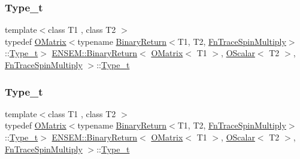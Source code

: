 \subsubsection{\texorpdfstring{Type\_t}{Type\_t}\hspace{0.1cm}{\footnotesize\ttfamily [2/3]}}
{\footnotesize\ttfamily template$<$class T1 , class T2 $>$ \\
typedef \mbox{\hyperlink{classENSEM_1_1OMatrix}{O\+Matrix}}$<$typename \mbox{\hyperlink{structENSEM_1_1BinaryReturn}{Binary\+Return}}$<$T1, T2, \mbox{\hyperlink{structENSEM_1_1FnTraceSpinMultiply}{Fn\+Trace\+Spin\+Multiply}}$>$\+::\mbox{\hyperlink{structENSEM_1_1BinaryReturn_3_01OMatrix_3_01T1_01_4_00_01OScalar_3_01T2_01_4_00_01FnTraceSpinMultiply_01_4_a7365e18c420935c8845b95d78d843106}{Type\+\_\+t}}$>$ \mbox{\hyperlink{structENSEM_1_1BinaryReturn}{E\+N\+S\+E\+M\+::\+Binary\+Return}}$<$ \mbox{\hyperlink{classENSEM_1_1OMatrix}{O\+Matrix}}$<$ T1 $>$, \mbox{\hyperlink{classENSEM_1_1OScalar}{O\+Scalar}}$<$ T2 $>$, \mbox{\hyperlink{structENSEM_1_1FnTraceSpinMultiply}{Fn\+Trace\+Spin\+Multiply}} $>$\+::\mbox{\hyperlink{structENSEM_1_1BinaryReturn_3_01OMatrix_3_01T1_01_4_00_01OScalar_3_01T2_01_4_00_01FnTraceSpinMultiply_01_4_a7365e18c420935c8845b95d78d843106}{Type\+\_\+t}}}

\mbox{\label{structENSEM_1_1BinaryReturn_3_01OMatrix_3_01T1_01_4_00_01OScalar_3_01T2_01_4_00_01FnTraceSpinMultiply_01_4_a7365e18c420935c8845b95d78d843106}} 
\subsubsection{\texorpdfstring{Type\_t}{Type\_t}\hspace{0.1cm}{\footnotesize\ttfamily [3/3]}}
{\footnotesize\ttfamily template$<$class T1 , class T2 $>$ \\
typedef \mbox{\hyperlink{classENSEM_1_1OMatrix}{O\+Matrix}}$<$typename \mbox{\hyperlink{structENSEM_1_1BinaryReturn}{Binary\+Return}}$<$T1, T2, \mbox{\hyperlink{structENSEM_1_1FnTraceSpinMultiply}{Fn\+Trace\+Spin\+Multiply}}$>$\+::\mbox{\hyperlink{structENSEM_1_1BinaryReturn_3_01OMatrix_3_01T1_01_4_00_01OScalar_3_01T2_01_4_00_01FnTraceSpinMultiply_01_4_a7365e18c420935c8845b95d78d843106}{Type\+\_\+t}}$>$ \mbox{\hyperlink{structENSEM_1_1BinaryReturn}{E\+N\+S\+E\+M\+::\+Binary\+Return}}$<$ \mbox{\hyperlink{classENSEM_1_1OMatrix}{O\+Matrix}}$<$ T1 $>$, \mbox{\hyperlink{classENSEM_1_1OScalar}{O\+Scalar}}$<$ T2 $>$, \mbox{\hyperlink{structENSEM_1_1FnTraceSpinMultiply}{Fn\+Trace\+Spin\+Multiply}} $>$\+::\mbox{\hyperlink{structENSEM_1_1BinaryReturn_3_01OMatrix_3_01T1_01_4_00_01OScalar_3_01T2_01_4_00_01FnTraceSpinMultiply_01_4_a7365e18c420935c8845b95d78d843106}{Type\+\_\+t}}}



